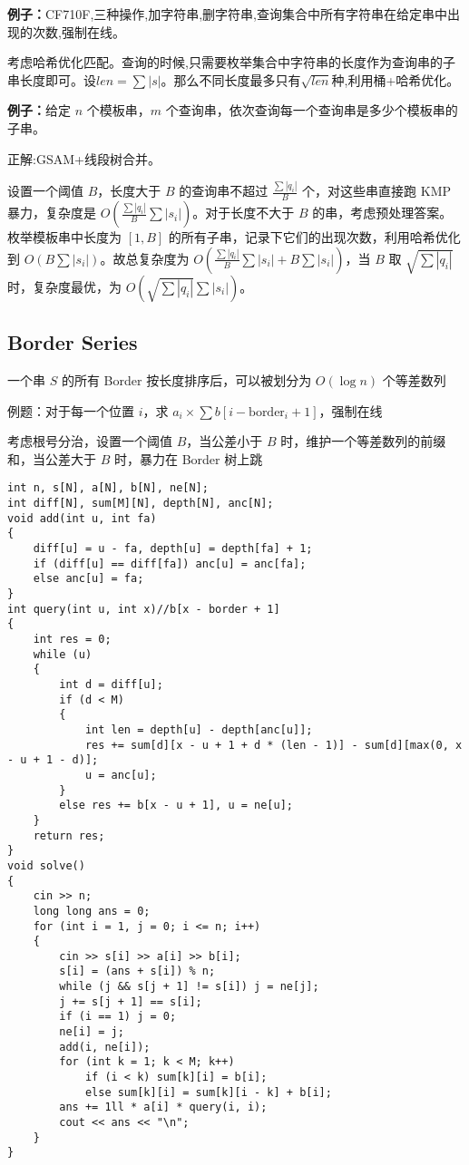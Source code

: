 \documentclass[a4paper, fontset=none]{ctexart}
\begin{document}
\textbf{例子：}CF710F,三种操作,加字符串,删字符串,查询集合中所有字符串在给定串中出现的次数,强制在线。

考虑哈希优化匹配。查询的时候,只需要枚举集合中字符串的长度作为查询串的子串长度即可。设$len=\sum|s|$。那么不同长度最多只有$\sqrt{len}$种,利用桶+哈希优化。

\textbf{例子：}给定 $n$ 个模板串，$m$ 个查询串，依次查询每一个查询串是多少个模板串的子串。

正解:GSAM+线段树合并。

设置一个阈值 $B$，长度大于 $B$ 的查询串不超过 $\frac{\sum|q_i|}{B}$ 个，对这些串直接跑 $\text{KMP}$ 暴力，复杂度是 $O(\frac{\sum|q_i|}{B}\sum|s_i|)$。对于长度不大于 $B$ 的串，考虑预处理答案。枚举模板串中长度为 $[1, B]$ 的所有子串，记录下它们的出现次数，利用哈希优化到 $O(B\sum|s_i|)$。故总复杂度为 $O(\frac{\sum|q_i|}{B}\sum|s_i|+B\sum|s_i|)$，当 $B$ 取 $\sqrt{\sum|q_i|}$ 时，复杂度最优，为 $O(\sqrt{\sum|q_i|}\sum|s_i|)$。
\subsection{Border Series}

一个串 $S$ 的所有 Border 按长度排序后，可以被划分为 $O(\log n)$ 个等差数列

例题：对于每一个位置 $i$，求 $a_i \times \sum b[i-\text{border}_i+1]$，强制在线

考虑根号分治，设置一个阈值 $B$，当公差小于 $B$ 时，维护一个等差数列的前缀和，当公差大于 $B$ 时，暴力在 Border 树上跳

\begin{verbatim}
int n, s[N], a[N], b[N], ne[N];
int diff[N], sum[M][N], depth[N], anc[N];
void add(int u, int fa)
{
    diff[u] = u - fa, depth[u] = depth[fa] + 1;
    if (diff[u] == diff[fa]) anc[u] = anc[fa];
    else anc[u] = fa;
}
int query(int u, int x)//b[x - border + 1]
{
    int res = 0;
    while (u)
    {
        int d = diff[u];
        if (d < M)
        {
            int len = depth[u] - depth[anc[u]];
            res += sum[d][x - u + 1 + d * (len - 1)] - sum[d][max(0, x - u + 1 - d)];
            u = anc[u];
        }
        else res += b[x - u + 1], u = ne[u];
    }
    return res;
}
void solve()
{
    cin >> n;
    long long ans = 0;
    for (int i = 1, j = 0; i <= n; i++)
    {
        cin >> s[i] >> a[i] >> b[i];
        s[i] = (ans + s[i]) % n;
        while (j && s[j + 1] != s[i]) j = ne[j];
        j += s[j + 1] == s[i];
        if (i == 1) j = 0;
        ne[i] = j;
        add(i, ne[i]);
        for (int k = 1; k < M; k++)
            if (i < k) sum[k][i] = b[i];
            else sum[k][i] = sum[k][i - k] + b[i];
        ans += 1ll * a[i] * query(i, i);
        cout << ans << "\n";
    }
}
\end{verbatim}
\end{document}

